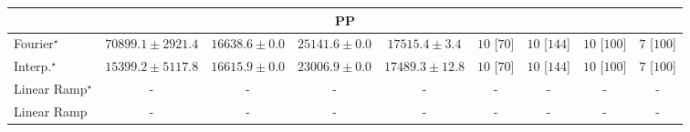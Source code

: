 \begin{tabular}{l|cccc|cccc|}
\cline{1-9}
\multicolumn{9}{c}{\rule{0pt}{8pt}PP} \\
\midrule
Fourier$^\star$ & {\cellcolor[HTML]{004529}} \color[HTML]{F1F1F1} $70899.1\pm 2921.4$ & {\cellcolor[HTML]{FBFDCF}} \color[HTML]{000000} $16638.6\pm 0.0$ & {\cellcolor[HTML]{E3F4AA}} \color[HTML]{000000} $25141.6\pm 0.0$ & {\cellcolor[HTML]{FAFDC9}} \color[HTML]{000000} $17515.4\pm 3.4$ & {\cellcolor[HTML]{49006A}} \color[HTML]{F1F1F1} $10$ [$70$] & {\cellcolor[HTML]{49006A}} \color[HTML]{F1F1F1} $10$ [$144$] & {\cellcolor[HTML]{49006A}} \color[HTML]{F1F1F1} $10$ [$100$] & {\cellcolor[HTML]{CD238F}} \color[HTML]{F1F1F1} $7$ [$100$] \\
Interp.$^\star$ & {\cellcolor[HTML]{FCFED7}} \color[HTML]{000000} $15399.2\pm 5117.8$ & {\cellcolor[HTML]{FBFDCF}} \color[HTML]{000000} $16615.9\pm 0.0$ & {\cellcolor[HTML]{ECF7B1}} \color[HTML]{000000} $23006.9\pm 0.0$ & {\cellcolor[HTML]{FAFDC9}} \color[HTML]{000000} $17489.3\pm 12.8$ & {\cellcolor[HTML]{49006A}} \color[HTML]{F1F1F1} $10$ [$70$] & {\cellcolor[HTML]{49006A}} \color[HTML]{F1F1F1} $10$ [$144$] & {\cellcolor[HTML]{49006A}} \color[HTML]{F1F1F1} $10$ [$100$] & {\cellcolor[HTML]{CD238F}} \color[HTML]{F1F1F1} $7$ [$100$] \\
Linear Ramp$^\star$ & {\cellcolor[HTML]{000000}} \color[HTML]{F1F1F1} {\cellcolor{white}} \color{black} - & {\cellcolor[HTML]{000000}} \color[HTML]{F1F1F1} {\cellcolor{white}} \color{black} - & {\cellcolor[HTML]{000000}} \color[HTML]{F1F1F1} {\cellcolor{white}} \color{black} - & {\cellcolor[HTML]{000000}} \color[HTML]{F1F1F1} {\cellcolor{white}} \color{black} - & {\cellcolor[HTML]{000000}} \color[HTML]{F1F1F1} {\cellcolor{white}} \color{black} - & {\cellcolor[HTML]{000000}} \color[HTML]{F1F1F1} {\cellcolor{white}} \color{black} - & {\cellcolor[HTML]{000000}} \color[HTML]{F1F1F1} {\cellcolor{white}} \color{black} - & {\cellcolor[HTML]{000000}} \color[HTML]{F1F1F1} {\cellcolor{white}} \color{black} - \\
Linear Ramp & {\cellcolor[HTML]{000000}} \color[HTML]{F1F1F1} {\cellcolor{white}} \color{black} - & {\cellcolor[HTML]{000000}} \color[HTML]{F1F1F1} {\cellcolor{white}} \color{black} - & {\cellcolor[HTML]{000000}} \color[HTML]{F1F1F1} {\cellcolor{white}} \color{black} - & {\cellcolor[HTML]{000000}} \color[HTML]{F1F1F1} {\cellcolor{white}} \color{black} - & {\cellcolor[HTML]{000000}} \color[HTML]{F1F1F1} {\cellcolor{white}} \color{black} - & {\cellcolor[HTML]{000000}} \color[HTML]{F1F1F1} {\cellcolor{white}} \color{black} - & {\cellcolor[HTML]{000000}} \color[HTML]{F1F1F1} {\cellcolor{white}} \color{black} - & {\cellcolor[HTML]{000000}} \color[HTML]{F1F1F1} {\cellcolor{white}} \color{black} - \\

\end{tabular}
